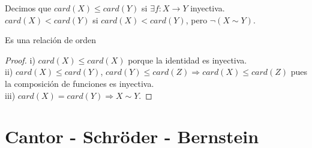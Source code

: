 \begin{definition}
    Decimos que $card(X) \leq card(Y)$ si $\exists f: X \to Y$ inyectiva. \\
    $card(X) < card(Y)$ si $card(X) < card(Y)$, pero $\neg(X\sim Y)$.
\end{definition}

\begin{prop}
    Es una relación de orden
    \begin{proof}
        i) $card(X) \leq card(X)$ porque la identidad es inyectiva. \\
        ii) $card(X) \leq card(Y)$, $card(Y) \leq card(Z) \Rightarrow card(X) \leq card(Z)$ pues la composición de funciones es inyectiva. \\
        iii) $card(X) = card(Y) \Rightarrow X \sim Y$.
    \end{proof}
\end{prop}

\section{Cantor - Schröder - Bernstein}

